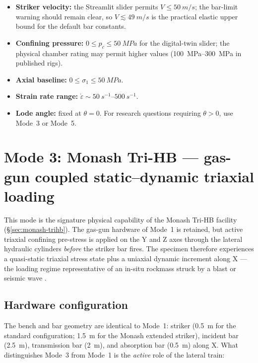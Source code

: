 \documentclass[11pt,a4paper,openany]{book}
\providecommand{\SI}[2]{\qty{#1}{#2}}
\providecommand{\SIrange}[3]{\qtyrange{#1}{#2}{#3}}
\theoremstyle{handbook}
\newcommand{\sig}{\sigma}
\newcommand{\eps}{\varepsilon}
\newcommand{\epsdot}{\dot\eps}
\begin{document}
\begin{itemize}[leftmargin=*]
  \item \textbf{Striker velocity:} the Streamlit slider permits
        $V\le\SI{50}{m/s}$; the bar-limit warning should remain clear, so
        $V\lesssim\SI{49}{m/s}$ is the practical elastic upper bound for
        the default bar constants.
  \item \textbf{Confining pressure:} $0\le p_c\le\SI{50}{MPa}$ for the
        digital-twin slider; the physical chamber rating may permit
        higher values (\SIrange{100}{300}{MPa} in published rigs).
  \item \textbf{Axial baseline:} $0\le\sig_1\le\SI{50}{MPa}$.
  \item \textbf{Strain rate range:} $\epsdot\sim\SIrange{50}{500}{s^{-1}}$.
  \item \textbf{Lode angle:} fixed at $\theta=0$. For research questions
        requiring $\theta>0$, use Mode~3 or Mode~5.
\end{itemize}


\chapter{Mode 3: Monash Tri-HB --- gas-gun coupled static--dynamic triaxial loading}\label{ch:mode3}

This mode is the signature physical capability of the Monash Tri-HB
facility (\S\ref{sec:monash-trihb}). The gas-gun hardware of Mode~1 is
retained, but active triaxial confining pre-stress is applied on the Y and Z
axes through the lateral hydraulic cylinders \emph{before} the striker bar
fires. The specimen therefore experiences a quasi-static triaxial stress
state plus a uniaxial dynamic increment along X --- the loading regime
representative of an in-situ rockmass struck by a blast or seismic wave
\cite{Liu2019,Zhang2019Tri}.

\section{Hardware configuration}

The bench and bar geometry are identical to Mode~1: striker
(\SI{0.5}{m} for the standard configuration; \SI{1.5}{m} for the Monash
extended striker), incident bar (\SI{2.5}{m}), transmission bar (\SI{2}{m}),
and absorption bar (\SI{0.5}{m}) along X. What distinguishes Mode~3 from
Mode~1 is the \emph{active} role of the lateral train:
\end{document}

